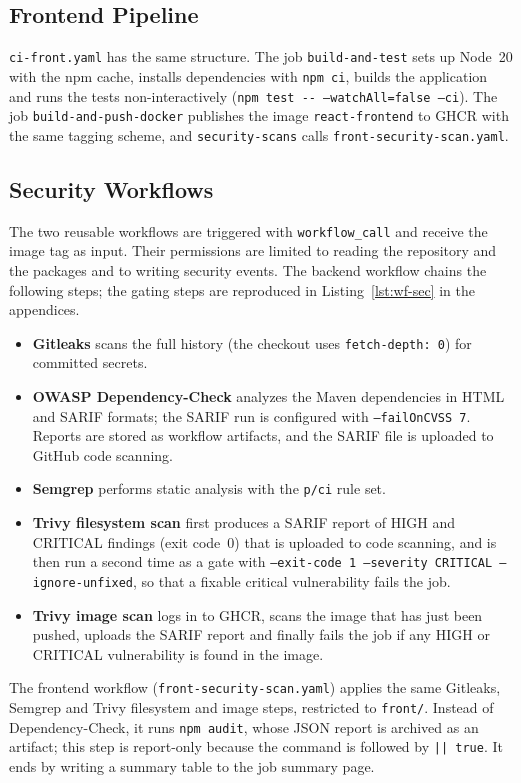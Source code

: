 \subsection{Frontend Pipeline}

\texttt{ci-front.yaml} has the same structure. The job \texttt{build-and-test} sets up Node~20 with the npm cache, installs dependencies with \texttt{npm ci}, builds the application and runs the tests non-interactively (\texttt{npm test -{}- --watchAll=false --ci}). The job \texttt{build-and-push-docker} publishes the image \texttt{react-frontend} to GHCR with the same tagging scheme, and \texttt{security-scans} calls \texttt{front-security-scan.yaml}.

\subsection{Security Workflows}

The two reusable workflows are triggered with \texttt{workflow\_call} and receive the image tag as input. Their permissions are limited to reading the repository and the packages and to writing security events. The backend workflow chains the following steps; the gating steps are reproduced in Listing~\ref{lst:wf-sec} in the appendices.
\begin{itemize}
  \item \textbf{Gitleaks} scans the full history (the checkout uses \texttt{fetch-depth: 0}) for committed secrets.
  \item \textbf{OWASP Dependency-Check} analyzes the Maven dependencies in HTML and SARIF formats; the SARIF run is configured with \texttt{--failOnCVSS 7}. Reports are stored as workflow artifacts, and the SARIF file is uploaded to GitHub code scanning.
  \item \textbf{Semgrep} performs static analysis with the \texttt{p/ci} rule set.
  \item \textbf{Trivy filesystem scan} first produces a SARIF report of HIGH and CRITICAL findings (exit code~0) that is uploaded to code scanning, and is then run a second time as a gate with \texttt{--exit-code 1 --severity CRITICAL --ignore-unfixed}, so that a fixable critical vulnerability fails the job.
  \item \textbf{Trivy image scan} logs in to GHCR, scans the image that has just been pushed, uploads the SARIF report and finally fails the job if any HIGH or CRITICAL vulnerability is found in the image.
\end{itemize}
The frontend workflow (\texttt{front-security-scan.yaml}) applies the same Gitleaks, Semgrep and Trivy filesystem and image steps, restricted to \texttt{front/}. Instead of Dependency-Check, it runs \texttt{npm audit}, whose JSON report is archived as an artifact; this step is report-only because the command is followed by \texttt{|| true}. It ends by writing a summary table to the job summary page.



